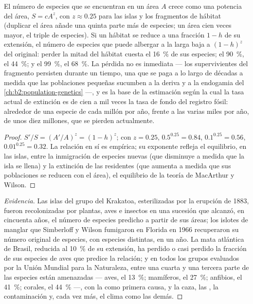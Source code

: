 \begin{theorem}\label{thm:b2:global-change:sar}
El número de especies que se encuentran en un área $A$ crece como una
potencia del área, $S = cA^{z}$, con $z \approx 0.25$ para las islas y los
fragmentos de hábitat (duplicar el área añade una quinta parte más de
especies; un área cien veces mayor, el triple de especies). Si un hábitat
se reduce a una fracción $1 - h$ de su extensión, el número de especies
que puede albergar a la larga baja a $(1 - h)^{z}$ del original: perder
la mitad del hábitat cuesta el \qty{16}{\%} de sus especies; el
\qty{90}{\%}, el \qty{44}{\%}; y el \qty{99}{\%}, el
\qty{68}{\%}. La pérdida no es inmediata --- los supervivientes del
fragmento persisten durante un tiempo, una \emph{} que se
paga a lo largo de décadas a medida que las poblaciones pequeñas sucumben a
la deriva y a la endogamia del
\cref{ch:b2:population-genetics} ---, y es la base de la estimación según
la cual la tasa actual de extinción es de cien a mil veces la tasa de fondo
del registro fósil: alrededor de una especie de cada millón por año, frente
a las varias miles por año, de unos diez millones, que se pierden
actualmente.
\end{theorem}
\begin{proof}
$S'/S = (A'/A)^{z} = (1 - h)^{z}$; con $z = 0.25$, $0.5^{0.25} =
0.84$, $0.1^{0.25} = 0.56$, $0.01^{0.25} = 0.32$. La relación en sí es
empírica; su exponente refleja el equilibrio, en las islas, entre la
inmigración de especies nuevas (que disminuye a medida que la isla se
llena) y la extinción de las residentes (que aumenta a medida que sus
poblaciones se reducen con el área), el equilibrio de la teoría de
MacArthur y Wilson.
\end{proof}
\begin{proof}[Evidencia]
Las islas del grupo del Krakatoa, esterilizadas por la erupción de 1883,
fueron recolonizadas por plantas, aves e insectos en una sucesión que
alcanzó, en cincuenta años, el número de especies predicho a partir de sus
áreas; los islotes de manglar que Simberloff y Wilson fumigaron en Florida
en 1966 recuperaron su número original de especies, con especies
distintas, en un año. La mata atlántica de Brasil, reducida al
\qty{10}{\%} de su extensión, ha perdido o casi perdido la fracción de sus
especies de aves que predice la relación; y en todos los grupos evaluados
por la Unión Mundial para la Naturaleza, entre una cuarta y una tercera
parte de las especies están amenazadas --- aves, el
\qty{13}{\%}; mamíferos, el \qty{27}{\%}; anfibios, el \qty{41}{\%};
corales, el
\qty{44}{\%} ---, con la  como primera causa, y la caza,
las , la contaminación y, cada vez más, el clima como las
demás.
\end{proof}
